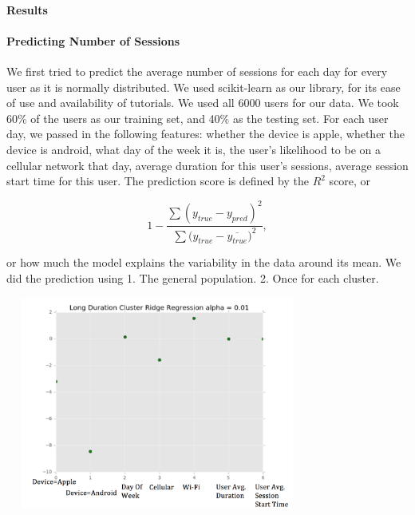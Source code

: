 \documentclass[]{article}
\newenvironment{Figure}
  {\par\medskip\noindent\minipage{\linewidth}}
  {\endminipage\par\medskip}
\begin{document}
\paragraph{Results}
\paragraph{Predicting Number of Sessions}
We first tried to predict the average number of sessions for each day for every user as it is normally distributed. We used scikit-learn\cite{scikitlearn} as our library, for its ease of use and availability of tutorials. We used all 6000 users for our data. We took 60\% of the users as our training set, and 40\% as the testing set. For each user day, we passed in the following features: whether the device is apple, whether the device is android, what day of the week it is, the user's likelihood to be on a cellular network that day, average duration for this user's sessions, average session start time for this user. The prediction score is defined by the $R^2$ score, or

\begin{equation*}
1 - \frac{\sum{(y_{true} - y_{pred} )^2}}{\sum{(y_{true} - \overline{y_{true}}})^2},
\end{equation*}

or how much the model explains the variability in the data around its mean. We did the prediction using 1. The general population. 2. Once for each cluster.

\begin{Figure}
 \centering
 \includegraphics[height = 7cm, width =10cm]{fixedFeatures.png}
\end{Figure}
\end{document}
